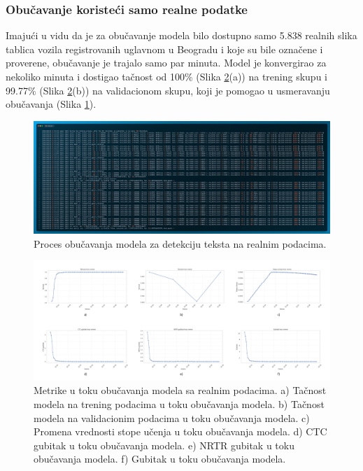 \documentclass[a4paper,12pt]{article}
\begin{document}
	\subsubsection{Obučavanje koristeći samo realne podatke}
	
	Imajući u vidu da je za obučavanje modela bilo dostupno samo 5.838 realnih slika tablica vozila registrovanih uglavnom u Beogradu i koje su bile označene i proverene, obučavanje je trajalo samo par minuta. Model je konvergirao za nekoliko minuta i dostigao tačnost od 100\% (Slika \ref{fig:real-data-metrics}(a)) na trening skupu i 99.77\% (Slika \ref{fig:real-data-metrics}(b)) na validacionom skupu, koji je pomogao u usmeravanju obučavanja (Slika \ref{fig:train-code-real-data}).
	
	\begin{figure}[H]
		\centering
		\includegraphics[width=\textwidth]{assets/train-code-real-data.png}
		\caption{Proces obučavanja modela za detekciju teksta na realnim podacima.}
		\label{fig:train-code-real-data}
	\end{figure}
	
	\begin{figure}[H]
		\centering
		\includegraphics[width=\textwidth]{assets/real-data-metrics.png}
		\caption{Metrike u toku obučavanja modela sa realnim podacima. a) Tačnost modela na trening podacima u toku obučavanja modela. b) Tačnost modela na validacionim podacima u toku obučavanja modela. c) Promena vrednosti stope učenja u toku obučavanja modela. d) CTC gubitak u toku obučavanja modela. e) NRTR gubitak u toku obučavanja modela. f) Gubitak u toku obučavanja modela.}
		\label{fig:real-data-metrics}
	\end{figure}
	
\end{document}
